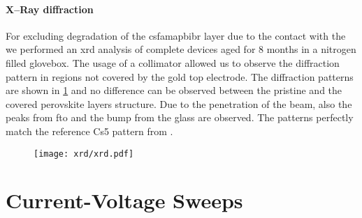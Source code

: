 	\paragraph{X--Ray diffraction}
	For excluding degradation of the \gls{csfamapbibr} layer due to the contact with the  we performed an \gls{xrd} analysis of complete devices aged for 8 months in a nitrogen filled glovebox.
	The usage of a collimator allowed us to observe the diffraction pattern in regions not covered by the gold top electrode.
	The diffraction patterns are shown in \cref{fig:tae_xrd} and no difference can be observed between the pristine and the covered perovskite layers structure.
	Due to the penetration of the beam, also the peaks from \gls{fto} and the bump from the glass are observed.
	The patterns perfectly match the reference Cs5 pattern from .




	\begin{figure}
		\centering
		\texttt{[image: xrd/xrd.pdf]}
		\label{fig:tae_xrd}
	\end{figure}


\section{Current-Voltage Sweeps}

